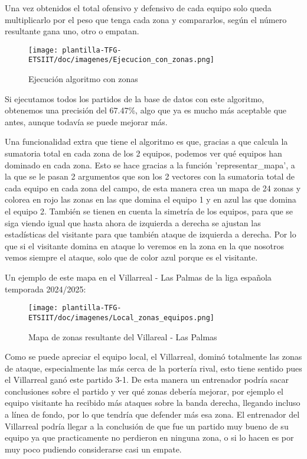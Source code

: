 Una vez obtenidos el total ofensivo y defensivo de cada equipo solo queda multiplicarlo por el peso que tenga cada zona y compararlos, según el número resultante gana uno, otro o empatan.

\begin{figure}[H]
    \centering
    \texttt{[image: plantilla-TFG-ETSIIT/doc/imagenes/Ejecucion\_con\_zonas.png]}
    \caption{Ejecución algoritmo con zonas}
    \label{fig:etiqueta-imagen}
\end{figure}

Si ejecutamos todos los partidos de la base de datos con este algoritmo, obtenemos una precisión del 67.47\%, algo que ya es mucho más aceptable que antes, aunque todavía se puede mejorar más.

Una funcionalidad extra que tiene el algoritmo es que, gracias a que calcula la sumatoria total en cada zona de los 2 equipos, podemos ver qué equipos han dominado en cada zona. Esto se hace gracias a la función 'representar\_mapa', a la que se le pasan 2 argumentos que son los 2 vectores con la sumatoria total de cada equipo en cada zona del campo, de esta manera crea un mapa de 24 zonas y colorea en rojo las zonas en las que domina el equipo 1 y en azul las que domina el equipo 2. También se tienen en cuenta la simetría de los equipos, para que se siga viendo igual que hasta ahora de izquierda a derecha se ajustan las estadísticas del visitante para que también ataque de izquierda a derecha. Por lo que si el visitante domina en ataque lo veremos en la zona en la que nosotros vemos siempre el ataque, solo que de color azul porque es el visitante.

Un ejemplo de este mapa en el Villarreal - Las Palmas de la liga española temporada 2024/2025:

\begin{figure}[H]
    \centering
    \texttt{[image: plantilla-TFG-ETSIIT/doc/imagenes/Local\_zonas\_equipos.png]}
    \caption{Mapa de zonas resultante del Villareal - Las Palmas}
    \label{fig:etiqueta-imagen}
\end{figure}

Como se puede apreciar el equipo local, el Villarreal, dominó totalmente las zonas de ataque, especialmente las más cerca de la portería rival, esto tiene sentido pues el Villarreal ganó este partido 3-1. De esta manera un entrenador podría sacar conclusiones sobre el partido y ver qué zonas debería mejorar, por ejemplo el equipo visitante ha recibido más ataques sobre la banda derecha, llegando incluso a línea de fondo, por lo que tendría que defender más esa zona. El entrenador del Villarreal podría llegar a la conclusión de que fue un partido muy bueno de su equipo ya que practicamente no perdieron en ninguna zona, o si lo hacen es por muy poco pudiendo considerarse casi un empate.

